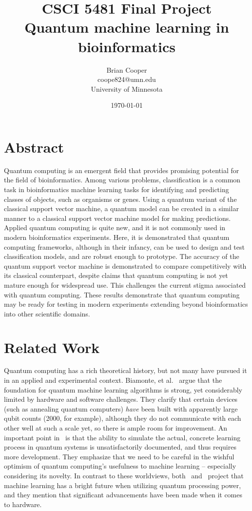 \documentclass{article}
\title{%
  CSCI 5481 Final Project \\
  \large Quantum machine learning in bioinformatics
}
\author{Brian Cooper \\ coope824@umn.edu \\ University of Minnesota}
\date{\today}
\begin{document}
\maketitle

\section{Abstract}
  Quantum computing is an emergent field that provides promising potential for the field of bioinformatics. Among various problems, classification is a common task in bioinformatics machine learning tasks for identifying and predicting classes of objects, such as organisms or genes. Using a quantum variant of the classical support vector machine, a quantum model can be created in a similar manner to a classical support vector machine model for making predictions. Applied quantum computing is quite new, and it is not commonly used in modern bioinformatics experiments. Here, it is demonstrated that quantum computing frameworks, although in their infancy, can be used to design and test classification models, and are robust enough to prototype. The accuracy of the quantum support vector machine is demonstrated to compare competitively with its classical counterpart, despite claims that quantum computing is not yet mature enough for widespread use. This challenges the current stigma associated with quantum computing. These results demonstrate that quantum computing may be ready for testing in modern experiments extending beyond bioinformatics into other scientific domains.

\section{Related Work}
  Quantum computing has a rich theoretical history, but not many have pursued it in an applied and experimental context. Biamonte, et al.~\cite{biamonte} argue that the foundation for quantum machine learning algorithms is strong, yet considerably limited by hardware and software challenges. They clarify that certain devices (such as annealing quantum computers) \textit{have} been built with apparently large qubit counts (2000, for example), although they do not communicate with each other well at such a scale yet, so there is ample room for improvement. An important point in~\cite{schuld} is that the ability to simulate the actual, concrete learning process in quantum systems is unsatisfactorily documented, and thus requires more development. They emphasize that we need to be careful in the wishful optimism of quantum computing's usefulness to machine learning -- especially considering its novelty. In contrast to these worldviews, both~\cite{biamonte} and~\cite{schuld} project that machine learning has a bright future when utilizing quantum processing power, and they mention that significant advancements have been made when it comes to hardware.
\end{document}
